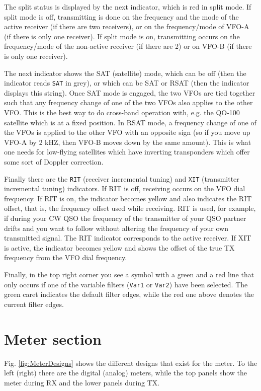 \documentclass[12pt]{book}
\def\rett#1{\texttt{\color{red}#1}}
\begin{document}
The split status is displayed by the next indicator, which is red in
split mode. If split mode is off, transmitting is done on the frequency
and the mode of the active receiver (if there are two receivers), or
on the frequency/mode of VFO-A (if there is only one receiver). If
split mode is on, transmitting occurs on the frequency/mode of the
non-active receiver (if there are 2) or on VFO-B (if there is only  one
receiver).

The next indicator shows the SAT (satellite) mode, which can be off
(then the indicator reads \rett{SAT} in grey), or which can be SAT or RSAT
(then the indicator displays this string). Once SAT mode is engaged,
the two VFOs are tied together such that any frequency change of one
of the two VFOs also applies to the other VFO. This is the best way
to do cross-band operation with, e.g. the QO-100 satellite which is at
a fixed position. In RSAT mode, a frequency change of one of the VFOs
is applied to the other VFO with an opposite sign (so if you move up
VFO-A by 2 kHZ, then VFO-B moves down by the same amount). This is
what one needs for low-flying satellites which have inverting
transponders which offer some sort of Doppler correction.

Finally there are the \rett{RIT} (receiver incremental tuning) and \rett{XIT}
(transmitter incremental tuning) indicators. If RIT is off,
receiving occurs on the VFO dial frequency. If RIT is on, the
indicator becomes yellow and also indicates the RIT offset, that is,
the frequency offset used while receiving. RIT is used, for example,
if during your CW QSO the frequency of the transmitter of your
QSO partner drifts and you want to follow without altering the
frequency of your own transmitted signal. The RIT indicator
corresponds to the active receiver. If XIT is active, the
indicator becomes yellow and shows the offset of the true
TX frequency from the VFO dial frequency.

Finally, in the top right corner you see a symbol with a green and a red line
that only occurs if
one of the variable filters (\texttt{Var1} or \texttt{Var2}) have been
selected. The green caret indicates the default filter edges,  while the
red one above denotes the current filter edges.

\section{Meter section}
\label{sec:MeterSection}
Fig. \ref{fig:MeterDesigns} shows the different designs that exist for
the meter. To the left (right) there are the digital (analog) meters,
while the top panels show the meter during RX and the lower panels
during TX.
\end{document}
